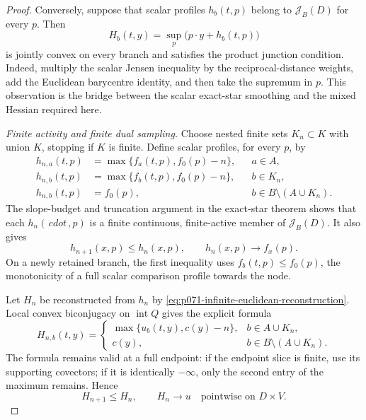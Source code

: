 \begin{proof}
Conversely, suppose that scalar profiles $h_b(t,p)$ belong to
$\mathscr J_B(D)$ for every $p$.  Then
\begin{equation}
 H_b(t,y)=\sup_p\bigl(p\mathbin\cdot y+h_b(t,p)\bigr)
 \label{eq:p071-infinite-euclidean-reconstruction}
\end{equation}
is jointly convex on every branch and satisfies the product junction
condition.  Indeed, multiply the scalar Jensen inequality by the
reciprocal-distance weights, add the Euclidean barycentre identity, and
then take the supremum in $p$.  This observation is the bridge between
the scalar exact-star smoothing and the mixed Hessian required here.

\medskip\noindent
\emph{Finite activity and finite dual sampling.}
Choose nested finite sets $K_n\subset K$ with union $K$, stopping if
$K$ is finite.  Define scalar profiles, for every $p$, by
\begin{align}
 h_{n,a}(t,p)&=\max\{f_a(t,p),f_0(p)-n\}, &&a\in A,
 \label{eq:p071-infinite-euclidean-truncate-a}\\
 h_{n,b}(t,p)&=\max\{f_b(t,p),f_0(p)-n\}, &&b\in K_n,
 \label{eq:p071-infinite-euclidean-truncate-k}\\
 h_{n,b}(t,p)&=f_0(p), &&b\in B\setminus(A\cup K_n).
 \label{eq:p071-infinite-euclidean-truncate-rest}
\end{align}
The slope-budget and truncation argument in the exact-star theorem shows
that each $h_n(\,cdot\,,p)$ is a finite continuous, finite-active member
of $\mathscr J_B(D)$.  It also gives
\begin{equation}
 h_{n+1}(x,p)\leq h_n(x,p),
 \qquad h_n(x,p)\longrightarrow f_x(p).
 \label{eq:p071-infinite-euclidean-profile-limit}
\end{equation}
On a newly retained branch, the first inequality uses
$f_b(t,p)\leq f_0(p)$, the monotonicity of a full scalar comparison
profile towards the node.

Let $H_n$ be reconstructed from $h_n$ by
\eqref{eq:p071-infinite-euclidean-reconstruction}.  Local convex
biconjugacy on $\operatorname{int}Q$ gives the explicit formula
\begin{equation}
 H_{n,b}(t,y)=
 \begin{cases}
  \max\{u_b(t,y),c(y)-n\},&b\in A\cup K_n,\\
  c(y),&b\in B\setminus(A\cup K_n).
 \end{cases}
 \label{eq:p071-infinite-euclidean-truncated-reconstruction}
\end{equation}
The formula remains valid at a full endpoint: if the endpoint slice is
finite, use its supporting covectors; if it is identically $-\infty$,
only the second entry of the maximum remains.  Hence
\begin{equation}
 H_{n+1}\leq H_n,
 \qquad H_n\longrightarrow u
 \quad\text{pointwise on }D\times V.
 \label{eq:p071-infinite-euclidean-H-limit}
\end{equation}


\end{proof}
